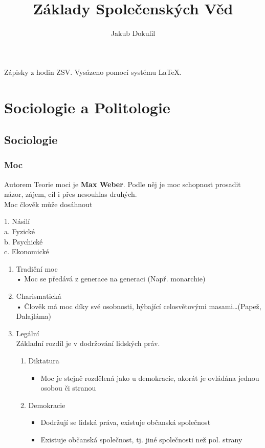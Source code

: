 \documentclass[10pt,a4paper,
twoside,%
]{report}
\author{Jakub Dokulil}
\title{Základy Společenských Věd}
\begin{document}
\begin{titlepage}
\maketitle
\end{titlepage}

\vspace{10cm}
\pagestyle{empty}
Zápisky z hodin ZSV. Vysázeno pomocí systému \LaTeX.

\newpage
\pagestyle{plain}

\begin{multicols}{2}
\tableofcontents
\end{multicols}
\part{Sociologie a Politologie}
\chapter{Sociologie}
\pagestyle{fancy}
\section{Moc}
Autorem Teorie moci je \textbf{ Max Weber}. Podle něj je  moc schopnost prosadit názor, zájem, cíl i přes nesouhlas druhých. \\
Moc člověk může dosáhnout

	1. Násilí\\
		a. Fyzické\\
		b. Psychické\\
		c. Ekonomické
\begin{enumerate}
	\item Tradiční moc\\
	• Moc se předává z generace na generaci (Např. monarchie)
	\item Charismatická\\
	• Člověk má moc díky své osobnosti, hýbající celosvětovými masami\ldots(Papež, Dalajláma)
	\item Legální\\
	Základní rozdíl je v dodržování lidských práv.
	\begin{enumerate}
	\item Diktatura  \begin{itemize}
		\item Moc je stejně rozdělená jako u demokracie, akorát je ovládána jednou osobou či stranou
	\end{itemize}
		 
	\item Demokracie  \begin{itemize}
		\item Dodržují se lidská práva, existuje občanská společnost
		\item Existuje občanská společnost, tj. jiné společnosti než pol. strany
	\end{itemize}
	\end{enumerate}
\end{enumerate}
\end{document}
